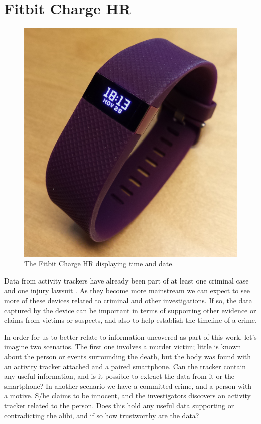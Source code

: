\documentclass[a4paper,11pt,dvips]{article}
\begin{document}
\section{Fitbit Charge HR}
\begin{figure}
	\begin{center}
		\includegraphics[natwidth=1000bp,natheight=1019bp,width=0.8\linewidth]{fitbit_charge_hr}
	\end{center}
	\caption{The Fitbit Charge HR displaying time and date.}
	\label{fig:fitbit_charge_hr}
\end{figure}
Data from activity trackers have already been part of at least one criminal case \citep{Snyder:2015} and one injury lawsuit \citep{Olson:2014}. As they become more mainstream we can expect to see more of these devices related to criminal and other investigations. If so, the data captured by the device can be important in terms of supporting other evidence or claims from victims or suspects, and also to help establish the timeline of a crime.

In order for us to better relate to information uncovered as part of this work, let's imagine two scenarios. The first one involves a murder victim; little is known about the person or events surrounding the death, but the body was found with an activity tracker attached and a paired smartphone. Can the tracker contain any useful information, and is it possible to extract the data from it or the smartphone? In another scenario we have a committed crime, and a person with a motive. S/he claims to be innocent, and the investigators discovers an activity tracker related to the person. Does this hold any useful data supporting or contradicting the alibi, and if so how trustworthy are the data?
\end{document}
